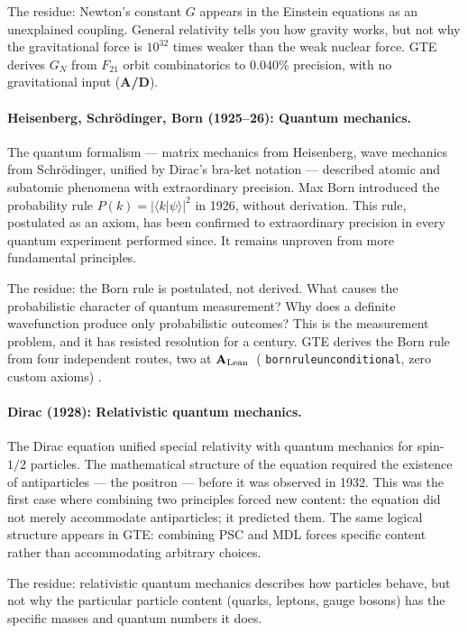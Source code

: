 \documentclass[11pt,openany]{book}
\theoremstyle{remark}
\newcommand{\lean}[1]{%
  \penalty-100
  \begingroup\def\_{\textunderscore\allowbreak}\texttt{#1}\endgroup}
\newcommand{\CatAL}{\ensuremath{\textbf{A}_{\rm Lean}}}
\newcommand{\CatAD}{\textbf{A/D}}
\begin{document}
The residue: Newton's constant $G$ appears in the Einstein equations as an
unexplained coupling.
General relativity tells you how gravity works, but not why the gravitational force
is $10^{32}$ times weaker than the weak nuclear force.
GTE derives $G_N$ from $F_{21}$ orbit combinatorics to $0.040\%$ precision, with no
gravitational input (\CatAD).

\paragraph{Heisenberg, Schr\"odinger, Born (1925--26): Quantum mechanics.}
The quantum formalism --- matrix mechanics from Heisenberg, wave mechanics from
Schr\"odinger, unified by Dirac's bra-ket notation --- described atomic and subatomic
phenomena with extraordinary precision.
Max Born introduced the probability rule $P(k) = |\langle k|\psi\rangle|^2$ in 1926,
without derivation.
This rule, postulated as an axiom, has been confirmed to extraordinary precision in
every quantum experiment performed since.
It remains unproven from more fundamental principles.

The residue: the Born rule is postulated, not derived.
What causes the probabilistic character of quantum measurement?
Why does a definite wavefunction produce only probabilistic outcomes?
This is the measurement problem, and it has resisted resolution for a century.
GTE derives the Born rule from four independent routes, two at \CatAL\
(\lean{born\_rule\_unconditional}, zero custom axioms) \cite{SpivackThreeTapeCMCA,SpivackPhiMDLField}.

\paragraph{Dirac (1928): Relativistic quantum mechanics.}
The Dirac equation unified special relativity with quantum mechanics for spin-$1/2$
particles.
The mathematical structure of the equation required the existence of antiparticles
--- the positron --- before it was observed in 1932.
This was the first case where combining two principles forced new content: the
equation did not merely accommodate antiparticles; it predicted them.
The same logical structure appears in GTE: combining PSC and MDL forces specific content
rather than accommodating arbitrary choices.

The residue: relativistic quantum mechanics describes how particles behave, but not
why the particular particle content (quarks, leptons, gauge bosons) has the specific
masses and quantum numbers it does.
\end{document}
